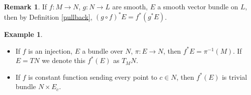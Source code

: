\documentclass{article}
\theoremstyle{definition}
\newtheorem{rmk}[thm]{Remark}
\newtheorem{exm}[thm]{Example}
\begin{document}
\begin{rmk}
    If $f: M\rightarrow N$, $g: N\rightarrow L$ are smooth, $E$ a smooth vector bundle on $L$, then by Definition \ref{pullback}, $(g\circ f)^*E=f^*(g^*E)$.
\end{rmk}

\begin{exm}
\begin{itemize}
    \item If $f$ is an injection, $E$ a bundle over $N$, $\pi: E\rightarrow N$, then $f^*E=\pi^{-1}(M)$. If $E=TN$ we denote this $f^*(E)$ as $T_M N$.
    \item If $f$ is constant function sending every point to $c\in N$, then $f^*(E)$ is trivial bundle $N\times E_c$.
\end{itemize}
\end{exm}
\end{document}
